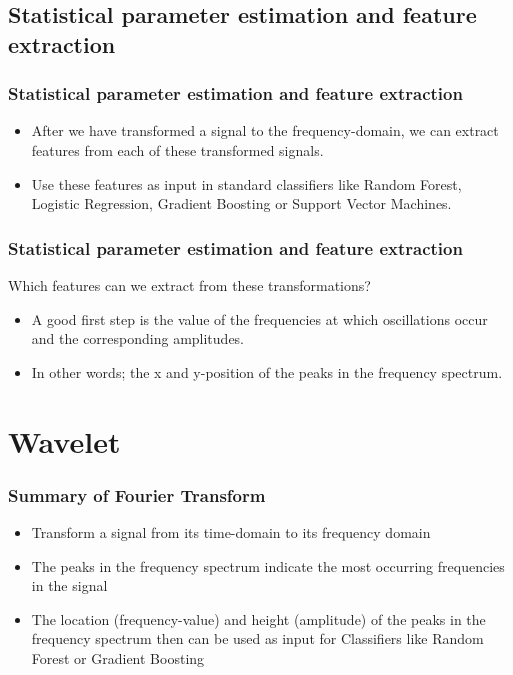 \documentclass{beamer}
\begin{document}
	\subsection{Statistical parameter estimation and feature extraction}
	\begin{frame}
		\frametitle{Statistical parameter estimation and feature extraction}
		
		\begin{itemize}
			\item
			
			After we have transformed a signal to the frequency-domain, we can extract features from each of these transformed signals.
			
			\item
			
			Use these features as input in standard classifiers like Random Forest, Logistic Regression, Gradient Boosting or Support Vector Machines.
			
		\end{itemize}	
		
	\end{frame}

\begin{frame}
	\frametitle{Statistical parameter estimation and feature extraction}
		Which features can we extract from these transformations? 
	
	\begin{itemize}


		\item
		
		A good first step is the value of the frequencies at which oscillations occur and the corresponding amplitudes.
		
		\item
		
		In other words; the x and y-position of the peaks in the frequency spectrum.
	\end{itemize}
	
\end{frame}



\section{Wavelet}
\begin{frame}
	\frametitle{Summary of Fourier Transform}
	
	\begin{itemize}
		\item 
		 Transform a signal from its time-domain to its frequency domain
		
		\item
		
		 The peaks in the frequency spectrum indicate the most occurring frequencies in the signal
		
		
		\item
		The location (frequency-value) and height (amplitude) of the peaks in the frequency spectrum then can be used as input for Classifiers like Random Forest or Gradient Boosting

	\end{itemize}
	
\end{frame}
\end{document}
